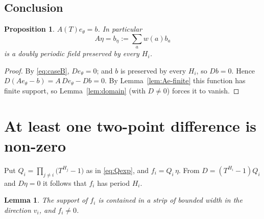 \documentclass[11pt,reqno]{amsart}
\theoremstyle{plain}
\newtheorem{lem}[thm]{Lemma}
\newtheorem{prop}[thm]{Proposition}
\theoremstyle{definition}
\theoremstyle{remark}
\theoremstyle{plain}
\theoremstyle{remark}
\theoremstyle{definition}
\numberwithin{equation}{section}
\begin{document}
\subsection{Conclusion}

\begin{prop}\label{prop:Ae-b}
$A(T)e_\theta=b$.  In particular
\[A\eta=b_\eta:=\sum_aw(a)b_a\]
is a doubly periodic field preserved by every $H_i$.
\end{prop}

\begin{proof}
By \eqref{eq:caseB}, $De_\theta=0$; and $b$ is preserved by every $H_i$, so
$Db=0$.  Hence $D(Ae_\theta-b)=A\,De_\theta-Db=0$.  By
Lemma~\ref{lem:Ae-finite} this function has finite support, so
Lemma~\ref{lem:domain} (with $D\ne0$) forces it to vanish.
\end{proof}

\section{At least one two-point difference is non-zero}\label{sec:twopoint}

Put $Q_i=\prod_{j\ne i}\bigl(T^{H_j}-1\bigr)$ as in \eqref{eq:Qexp}, and
$f_i=Q_i\,\eta$.  From $D=(T^{H_i}-1)Q_i$ and $D\eta=0$ it follows that $f_i$
has period $H_i$.

\begin{lem}\label{lem:fi}
The support of $f_i$ is contained in a strip of bounded width in the direction
$v_i$, and $f_i\ne0$.
\end{lem}
\end{document}
